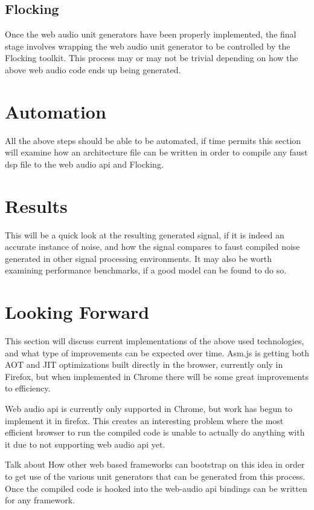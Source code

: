 \documentclass[runningheads,a4paper]{llncs}
\begin{document}
\subsection{Flocking}

Once the web audio unit generators have been properly implemented, the final stage involves wrapping the web audio unit generator to be controlled by the Flocking toolkit.  This process may or may not be trivial depending on how the above web audio code ends up being generated.

\section{Automation}

All the above steps should be able to be automated, if time permits this section will examine how an architecture file can be written in order to compile any faust dsp file to the web audio api and Flocking.

\section{Results}

This will be a quick look at the resulting generated signal, if it is indeed an accurate instance of noise, and how the signal compares to faust compiled noise generated in other signal processing environments.  It may also be worth examining performance benchmarks, if a good model can be found to do so.

\section{Looking Forward}

This section will discuss current implementations of the above used technologies, and what type of improvements can be expected over time.  Asm.js is getting both AOT and JIT optimizations built directly in the browser, currently only in Firefox, but when implemented in Chrome there will be some great improvements to efficiency.  

Web audio api is currently only supported in Chrome, but work has begun to implement it in firefox.  This creates an interesting problem where the most efficient browser to run the compiled code is unable to actually do anything with it due to not supporting web audio api yet.

Talk about How other web based frameworks can bootstrap on this idea in order to get use of the various unit generators that can be generated from this process.  Once the compiled code is hooked into the web-audio api bindings can be written for any framework.
\end{document}
